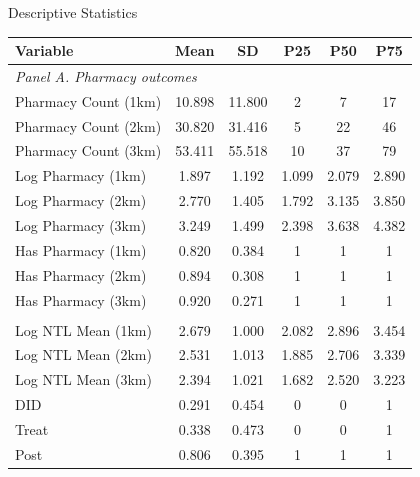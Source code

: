 \documentclass{beamer}
\begin{document}
\begin{frame}{Descriptive Statistics}

\centering
{\scriptsize
\begin{tabular}{lccccc}
\toprule
Variable & Mean & SD & P25 & P50 & P75 \\
\midrule

\multicolumn{6}{l}{\textit{Panel A. Pharmacy outcomes}} \\
Pharmacy Count (1km) & 10.898 & 11.800 & 2 & 7 & 17 \\
Pharmacy Count (2km) & 30.820 & 31.416 & 5 & 22 & 46 \\
Pharmacy Count (3km) & 53.411 & 55.518 & 10 & 37 & 79 \\
Log Pharmacy (1km)   & 1.897 & 1.192 & 1.099 & 2.079 & 2.890 \\
Log Pharmacy (2km)   & 2.770 & 1.405 & 1.792 & 3.135 & 3.850 \\
Log Pharmacy (3km)   & 3.249 & 1.499 & 2.398 & 3.638 & 4.382 \\
Has Pharmacy (1km)   & 0.820 & 0.384 & 1 & 1 & 1 \\
Has Pharmacy (2km)   & 0.894 & 0.308 & 1 & 1 & 1 \\
Has Pharmacy (3km)   & 0.920 & 0.271 & 1 & 1 & 1 \\

\addlinespace[0.15cm]
\multicolumn{6}{l}{\textit{Panel B. Nighttime lights and treatment status}} \\
Log NTL Mean (1km) & 2.679 & 1.000 & 2.082 & 2.896 & 3.454 \\
Log NTL Mean (2km) & 2.531 & 1.013 & 1.885 & 2.706 & 3.339 \\
Log NTL Mean (3km) & 2.394 & 1.021 & 1.682 & 2.520 & 3.223 \\
DID   & 0.291 & 0.454 & 0 & 0 & 1 \\
Treat & 0.338 & 0.473 & 0 & 0 & 1 \\
Post  & 0.806 & 0.395 & 1 & 1 & 1 \\

\bottomrule
\end{tabular}
}

\end{frame}
\end{document}
